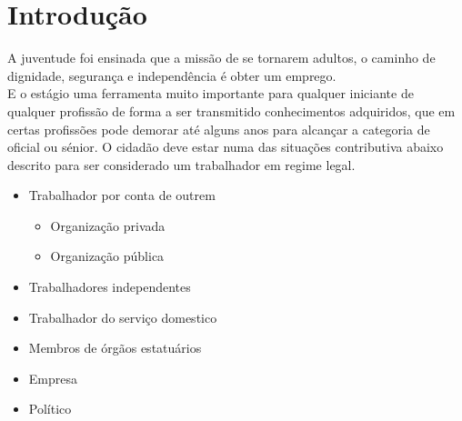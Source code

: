 \section{Introdução}
A juventude foi ensinada que a missão de se tornarem adultos, o caminho de dignidade, segurança e independência é obter um emprego. \cite{book-11} \\
E o estágio uma ferramenta muito importante para qualquer iniciante de qualquer profissão de forma a ser transmitido conhecimentos adquiridos, que em certas profissões pode demorar até alguns anos para alcançar a categoria de oficial ou sénior.
\emptyline
O cidadão deve estar numa das situações contributiva abaixo descrito para ser considerado um trabalhador em regime legal.
\emptyline
\begin{minipage}[t]{\linewidth}
	\begin{itemize}
		\setlength\itemsep{-0.3em}
		\item Trabalhador por conta de outrem
		\begin{itemize}
			\item Organização privada
			\item Organização pública
		\end{itemize}
		\item Trabalhadores independentes
		\newpage
		\item Trabalhador do serviço domestico
		\item Membros de órgãos estatuários
		\item Empresa
		\item Político
	\end{itemize}
\end{minipage}
